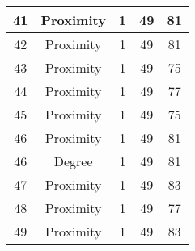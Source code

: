 \documentclass[results.tex]{subfiles}
\begin{document}
\begin{center}
\begin{tabular}{| c || c | c | c | c |}
    \hline
    41 & Proximity & 1 & 49 & 81 \\ 
    \hline
    42 & Proximity & 1 & 49 & 81 \\ 
    \hline
    43 & Proximity & 1 & 49 & 75 \\ 
    \hline
    44 & Proximity & 1 & 49 & 77 \\ 
    \hline
    45 & Proximity & 1 & 49 & 75 \\ 
    \hline
    46 & Proximity & 1 & 49 & 81 \\ 
    \hline
    46 & Degree & 1 & 49 & 81 \\ 
    \hline
    47 & Proximity & 1 & 49 & 83 \\ 
    \hline
    48 & Proximity & 1 & 49 & 77 \\ 
    \hline
    49 & Proximity & 1 & 49 & 83 \\ 
    \hline   \end{tabular}
\end{center}
\end{document}
